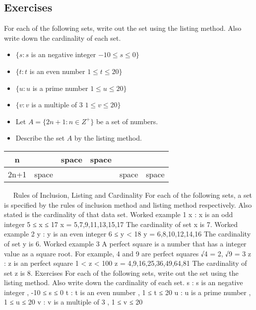 \documentclass[11pt,a4paper,titlepage,oneside,openany]{article}
\numberwithin{equation}{section}
\numberwithin{algorithm}{section}
\numberwithin{figure}{section}
\numberwithin{table}{section}
\begin{document}
\subsection*{Exercises}
For each of the following sets, write out the set using the listing method.
Also write down the cardinality of each set.

\begin{itemize} 
\item $\{ s : s $ is an negative integer $ -10 \leq s \leq 0 \}$
\item $\{ t : t $ is an even number $ 1 \leq t \leq 20 \}$
\item $\{ u : u $ is a prime number $ 1 \leq u \leq 20 \}$
\item $\{ v : v $ is a multiple of 3 $ 1 \leq v \leq 20 \}$
\end{itemize}
\newpage
\begin{itemize}
\item Let $A = \{2n+1 : n \in Z^{+}\}$ be a set of numbers.
\item Describe the set $A$ by the listing method.
\end{itemize} 
\begin{center}
\begin{tabular}{|c|c|c|c|c|c|}
\hline n &  &{\color{white} space}  & {\color{white} space} &  &  \\ 
\hline 2n+1 &{\color{white} space}  &  &  & {\color{white} space} &{\color{white} space}  \\ 
\hline 
\end{tabular} 
\end{center}

 
Rules of Inclusion, Listing and Cardinality
For each of the following sets, a set is specified by the rules of inclusion method and listing method respectively. Also stated is the cardinality of that data set.
Worked example 1
{ x : x  is an odd integer  5 ≤ x ≤ 17 }
x = {5,7,9,11,13,15,17}
The cardinality of set x is 7.
Worked example 2
{ y : y  is an even integer  6 ≤ y < 18 }
y = {6,8,10,12,14,16}
The cardinality of set y is 6.
Worked example 3
A perfect square is a number that has a integer value as a square root. For example, 4 and 9 are perfect squares √4  = 2, √9  = 3
{ z : z  is an perfect square  1 < z < 100 }
z = {4,9,16,25,36,49,64,81}
The cardinality of set z is 8.
Exercises
For each of the following sets, write out the set using the listing method.
Also write down the cardinality of each set.
{ s : s  is an negative integer , -10 ≤ s ≤ 0 }
{ t : t  is an even number , 1 ≤ t ≤ 20 }
{ u : u  is a prime number , 1 ≤ u ≤ 20 }
{ v : v  is a multiple of 3 , 1 ≤ v ≤ 20 }
\end{document}
